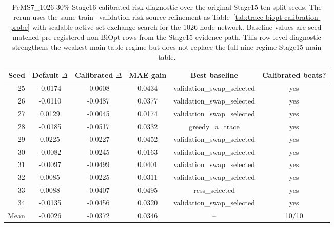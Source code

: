 \begin{table}[pos=htbp]
\centering
\caption{PeMS7\_1026 30\% Stage16 calibrated-risk diagnostic over the original Stage15 ten split seeds. The rerun uses the same train+validation risk-source refinement as Table~\ref{tab:trace-biopt-calibration-probe} with scalable active-set exchange search for the 1026-node network. Baseline values are seed-matched pre-registered non-BiOpt rows from the Stage15 evidence path. This row-level diagnostic strengthens the weakest main-table regime but does not replace the full nine-regime Stage15 main table.}
\label{tab:trace-biopt-stage16-calibrated-probe}
\small
\begin{tabular}{rccccc}
\toprule
Seed & Default $\Delta$ & Calibrated $\Delta$ & MAE gain & Best baseline & Calibrated beats? \\
\midrule
25 & -0.0174 & -0.0608 & 0.0434 & validation\_swap\_selected & yes \\
26 & -0.0110 & -0.0487 & 0.0377 & validation\_swap\_selected & yes \\
27 & 0.0129 & -0.0045 & 0.0174 & validation\_swap\_selected & yes \\
28 & -0.0185 & -0.0517 & 0.0332 & greedy\_a\_trace & yes \\
29 & 0.0225 & -0.0227 & 0.0452 & validation\_swap\_selected & yes \\
30 & -0.0082 & -0.0245 & 0.0163 & validation\_swap\_selected & yes \\
31 & -0.0097 & -0.0499 & 0.0401 & validation\_swap\_selected & yes \\
32 & 0.0085 & -0.0225 & 0.0311 & validation\_swap\_selected & yes \\
33 & 0.0088 & -0.0407 & 0.0495 & rcss\_selected & yes \\
34 & -0.0135 & -0.0456 & 0.0320 & validation\_swap\_selected & yes \\
\midrule
Mean & -0.0026 & -0.0372 & 0.0346 & -- & 10/10 \\
\bottomrule
\end{tabular}
\par\vspace{4pt}{\raggedright\footnotesize Calibrated-risk paired t-test versus zero delta: $p=4.6e-05$; Wilcoxon signed-rank $p=0.0010$; mean MAE-gain t-test $p=2.0e-06$. Negative $\Delta$ means TRACE-BiOpt has lower held-out GLS/MAP MAE than the seed-matched best pre-registered non-BiOpt baseline.\par}
\end{table}
